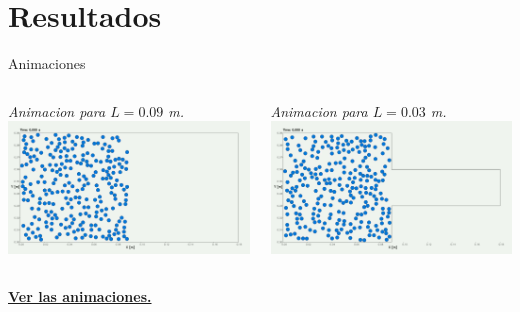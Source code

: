 \documentclass{beamer}
\begin{document}
\section{Resultados}
\begin{frame}{Animaciones}
  \begin{columns}
    \begin{column}{0.5\textwidth}
      \tiny \textit{Animacion para $L = 0.09$ m.}
      \includegraphics[width=1.10\linewidth]{photoMaterial/frame_09.png}
    \end{column}
    \begin{column}{0.5\textwidth}
      \tiny \textit{Animacion para $L = 0.03$ m.}
      \includegraphics[width=1.10\linewidth]{photoMaterial/frame_03.png}
    \end{column}
    \end{columns}
    \vspace{0.5cm}
    \begin{center}
    \footnotesize \href{https://drive.google.com/drive/u/0/folders/14M54Yl1cVpbTKp7pH25z3RIUNWCZJkpW}{\textbf{Ver las animaciones.}}
    \end{center}
\end{frame}
\end{document}
